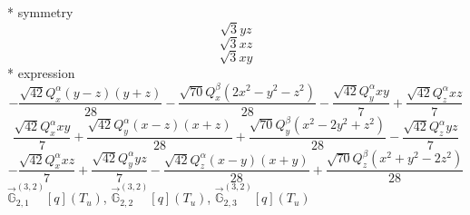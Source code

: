 \documentclass[fleqn,8pt]{jsarticle}
\begin{document}
\noindent\quad ** symmetry
\begin{dmath*}
\sqrt{3} y z
\end{dmath*}
\begin{dmath*}
\sqrt{3} x z
\end{dmath*}
\begin{dmath*}
\sqrt{3} x y
\end{dmath*}
\noindent\quad ** expression
\begin{dmath*}
- \frac{\sqrt{42} Q_{x}^{\alpha} \left(y - z\right) \left(y + z\right)}{28} - \frac{\sqrt{70} Q_{x}^{\beta} \left(2 x^{2} - y^{2} - z^{2}\right)}{28} - \frac{\sqrt{42} Q_{y}^{\alpha} x y}{7} + \frac{\sqrt{42} Q_{z}^{\alpha} x z}{7}
\end{dmath*}
\begin{dmath*}
\frac{\sqrt{42} Q_{x}^{\alpha} x y}{7} + \frac{\sqrt{42} Q_{y}^{\alpha} \left(x - z\right) \left(x + z\right)}{28} + \frac{\sqrt{70} Q_{y}^{\beta} \left(x^{2} - 2 y^{2} + z^{2}\right)}{28} - \frac{\sqrt{42} Q_{z}^{\alpha} y z}{7}
\end{dmath*}
\begin{dmath*}
- \frac{\sqrt{42} Q_{x}^{\alpha} x z}{7} + \frac{\sqrt{42} Q_{y}^{\alpha} y z}{7} - \frac{\sqrt{42} Q_{z}^{\alpha} \left(x - y\right) \left(x + y\right)}{28} + \frac{\sqrt{70} Q_{z}^{\beta} \left(x^{2} + y^{2} - 2 z^{2}\right)}{28}
\end{dmath*}
\noindent\quad $\vec{\mathbb{G}}_{2,1}^{(3,2)}[q](T_{u})$, $\vec{\mathbb{G}}_{2,2}^{(3,2)}[q](T_{u})$, $\vec{\mathbb{G}}_{2,3}^{(3,2)}[q](T_{u})$
\end{document}
